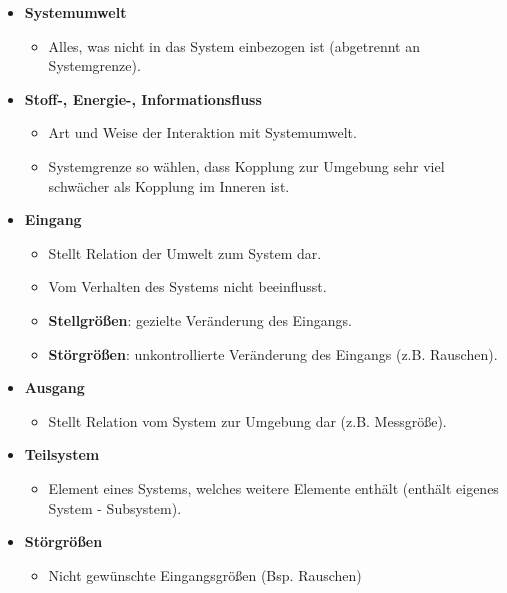 \begin{itemize}
    \item \textbf{Systemumwelt}
    \begin{itemize}
        \item Alles, was nicht in das System einbezogen ist (abgetrennt an Systemgrenze).
    \end{itemize}
    
    \item \textbf{Stoff-, Energie-, Informationsfluss}
    \begin{itemize}
        \item Art und Weise der Interaktion mit Systemumwelt.
        \item Systemgrenze so wählen, dass Kopplung zur Umgebung sehr viel schwächer als Kopplung im Inneren ist.
    \end{itemize}
    
    \item \textbf{Eingang}
    \begin{itemize}
        \item Stellt Relation der Umwelt zum System dar.
        \item Vom Verhalten des Systems nicht beeinflusst.
        \item \textbf{Stellgrößen}: gezielte Veränderung des Eingangs.
        \item \textbf{Störgrößen}: unkontrollierte Veränderung des Eingangs (z.B. Rauschen).
    \end{itemize}
    
    \item \textbf{Ausgang}
    \begin{itemize}
        \item Stellt Relation vom System zur Umgebung dar (z.B. Messgröße).
    \end{itemize}
    
    \item \textbf{Teilsystem}
    \begin{itemize}
        \item Element eines Systems, welches weitere Elemente enthält (enthält eigenes System - Subsystem).
    \end{itemize}
    
        \item \textbf{Störgrößen}
    \begin{itemize}
    	\item Nicht gewünschte Eingangsgrößen (Bsp. Rauschen)
    \end{itemize}
    
\end{itemize}

